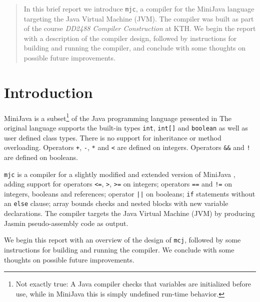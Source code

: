 \documentclass[a4paper,11pt]{article}
\date{15 May 2014}
\author{Daniel Månsson\\dmans@kth.se \and Elvis Stansvik\\stansvik@kth.se}
\begin{document}
\maketitle

\begin{abstract}
\noindent In this brief report we introduce \texttt{mjc}, a compiler for the MiniJava
language targeting the Java Virtual Machine (JVM). The compiler was built as part of
the course \emph{DD2488 Compiler Construction} at KTH. We begin the report with a description
of the compiler design, followed by instructions for building and running the compiler,
and conclude with some thoughts on possible future improvements.
\end{abstract}

\tableofcontents

\thispagestyle{empty}

\newpage

\section{Introduction}

MiniJava is a subset\footnote{Not exactly true: A Java compiler checks that variables are
initialized before use, while in MiniJava this is simply undefined run-time behavior.} of
the Java programming language presented in \cite{appel} The original language
supports the built-in types \texttt{int}, \texttt{int[]} and \texttt{boolean} as well as
user defined class types. There is no support for inheritance or method overloading.
Operators \texttt{+}, \texttt{-}, \texttt{*} and \texttt{<} are defined on integers.
Operators \texttt{\&\&} and \texttt{!} are defined on booleans.

\texttt{mjc} is a compiler for a slightly modified and extended version of MiniJava
\cite{grammar}, adding support for operators \texttt{<=}, \texttt{>}, \texttt{>=}
on integers; operators \texttt{==} and \texttt{!=} on integers, booleans and
references; operator \texttt{||} on booleans; \texttt{if} statements
without an \texttt{else} clause; array bounds checks and nested blocks with new variable
declarations. The compiler targets the Java Virtual Machine (JVM) by producing
Jasmin \cite{jasmin} pseudo-assembly code as output.

We begin this report with an overview of the design of \texttt{mcj}, followed by some
instructions for building and running the compiler. We conclude with some thoughts on
possible future improvements.
\end{document}
